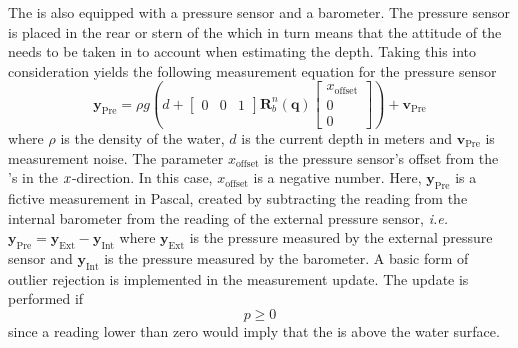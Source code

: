 The \abbrROV is also equipped with a pressure sensor and a barometer. The pressure sensor is placed in the rear or stern of the \abbrROV which in turn means that the attitude of the \abbrROV needs to be taken in to account when estimating the depth.
Taking this into consideration yields the following measurement equation for the pressure sensor
\begin{equation}
 \boldsymbol{y}_{\text{Pre}}=  \rho g \left(d + \begin{bmatrix}
    0 & 0 & 1
\end{bmatrix} \boldsymbol{R}^n_b(\boldsymbol{q}) 
\begin{bmatrix}
x_{\text{offset}}\\
0\\
0
\end{bmatrix}\right)
    + \boldsymbol{v}_{\text{Pre}}
\end{equation}
where $\rho$ is the density of the water, $d$ is the current depth in meters and $\boldsymbol{v}_{\text{Pre}}$ is measurement noise. The parameter $x_{\text{offset}}$ is the pressure sensor's offset from the \abbrROV's \abbrCO in the $x$-direction. In this case, $x_{\textrm{offset}}$ is a negative number. Here, $\boldsymbol{y}_{\text{Pre}}$ is a fictive measurement in Pascal, created by subtracting the reading from the internal barometer from the reading of the external pressure sensor, \emph{i.e.} $\boldsymbol{y}_{\text{Pre}} =\boldsymbol{y}_{\text{Ext}} - \boldsymbol{y}_{\text{Int}}$ where $\boldsymbol{y}_{\text{Ext}}$ is the pressure measured by the external pressure sensor and $\boldsymbol{y}_{\text{Int}}$ is the pressure measured by the barometer. A basic form of outlier rejection is implemented in the measurement update. The update is performed if \begin{equation}
    p \geq 0
\end{equation}
since a reading lower than zero would imply that the \abbrROV is above the water surface.